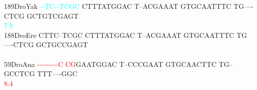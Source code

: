 \documentclass[11pt,twoside,reqno,a4paper]{article}
\begin{document}
{189\hspace*{1\charwidth}DroYak	\textcolor{cyan}{-}\textcolor{cyan}{-}\textcolor{cyan}{T}\textcolor{cyan}{C}\textcolor{cyan}{-}\textcolor{cyan}{-}\textcolor{cyan}{T}\textcolor{cyan}{C}\textcolor{cyan}{G}\textcolor{cyan}{C}	CTTTATGGAC	T--ACGAAAT	GTGCAATTTC	TG----CTCG	GCTGTCGAGT	\\
\hspace*{4\charwidth}\hspace*{7\charwidth}\hspace*{0\charwidth}\textcolor{cyan}{7.9}\hspace*{1\charwidth}\hspace*{1\charwidth}\hspace*{1\charwidth}\hspace*{1\charwidth}\hspace*{1\charwidth}\hspace*{1\charwidth}\\
188\hspace*{1\charwidth}DroEre	CTTC--TCGC	CTTTATGGAC	T--ACGAAAT	GTGCAATTTC	TG----CTCG	GCTGCCGAGT	\\
\hspace*{4\charwidth}\hspace*{7\charwidth}\hspace*{1\charwidth}\hspace*{1\charwidth}\hspace*{1\charwidth}\hspace*{1\charwidth}\hspace*{1\charwidth}\hspace*{1\charwidth}\\
59\hspace*{2\charwidth}DroAna	\textcolor{red}{-}\textcolor{red}{-}\textcolor{red}{-}\textcolor{red}{-}\textcolor{red}{-}\textcolor{red}{-}\textcolor{red}{-}\textcolor{red}{-}\textcolor{red}{-}\textcolor{red}{C}	\textcolor{red}{C}\textcolor{red}{G}GAATGGAC	T--CCCGAAT	GTGCAACTTC	TG--GCCTCG	TTT----GGC	\\
\hspace*{4\charwidth}\hspace*{7\charwidth}\hspace*{0\charwidth}\textcolor{red}{8.4}\hspace*{1\charwidth}\hspace*{1\charwidth}\hspace*{1\charwidth}\hspace*{1\charwidth}\hspace*{1\charwidth}\hspace*{1\charwidth}\\
}
\end{document}
